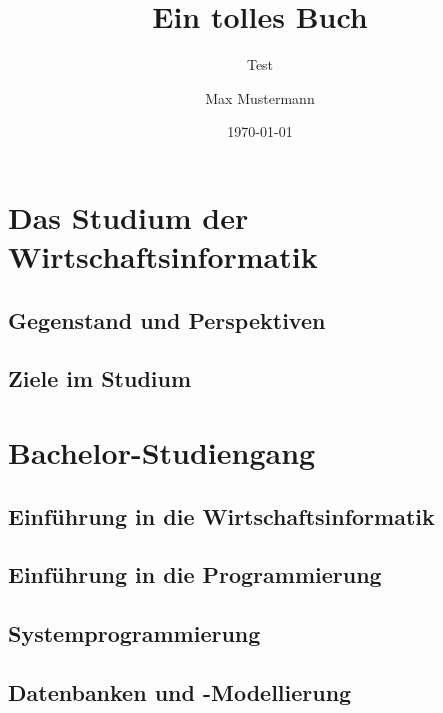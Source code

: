 \documentclass{hswbook}
\author{Max Mustermann}
\date{\today}
\title{Ein tolles Buch}
\subtitle{Test}
\begin{document}
\maketitle

\clearpage
    
\clearpage
\tableofcontents
\listoffigures
\listoftables



\part{Das Studium der Wirtschaftsinformatik}\label{part:allgemeines}
    \chapter{Gegenstand und Perspektiven}\label{chap:gegenstand}
    \chapter{Ziele im Studium}\label{chap:ziele}

\part{Bachelor-Studiengang}\label{part:ba-studiengang}
    \chapter{Einführung in die Wirtschaftsinformatik}\label{chap:ewi}
    \chapter{Einführung in die Programmierung}\label{chap:eip}
    \chapter{Systemprogrammierung}\label{chap:sysprog}
    \chapter{Datenbanken und -Modellierung}\label{chap:db1}
\end{document}
